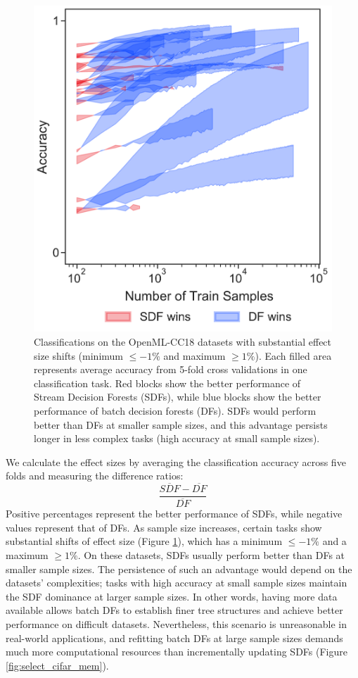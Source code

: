 \begin{figure}[!htb]
\centering
\includegraphics[width=0.4\columnwidth]{cc18_fill}
  \caption{Classifications on the OpenML-CC18 datasets with substantial effect size shifts (minimum $\leq -1\%$ and maximum $\geq 1\%$). Each filled area represents average accuracy from 5-fold cross validations in one classification task. Red blocks show the better performance of Stream Decision Forests (SDFs), while blue blocks show the better performance of batch decision forests (DFs). SDFs would perform better than DFs at smaller sample sizes, and this advantage persists longer in less complex tasks (high accuracy at small sample sizes).
  }
\label{fig:cc18_fill}
\end{figure}

We calculate the effect sizes by averaging the classification accuracy across five folds and measuring the difference ratios:
\begin{equation*} \frac{\overline{SDF} - \overline{DF}}{\overline{DF}} \tag{2} \end{equation*}
Positive percentages represent the better performance of SDFs, while negative values represent that of DFs. 
As sample size increases, certain tasks show substantial shifts of effect size (Figure \ref{fig:cc18_fill}), which has a minimum $\leq -1\%$ and a maximum $\geq 1\%$. 
On these datasets, SDFs usually perform better than DFs at smaller sample sizes. The persistence of such an advantage would depend on the datasets' complexities; tasks with high accuracy at small sample sizes maintain the SDF dominance at larger sample sizes. In other words, having more data available allows batch DFs to establish finer tree structures and achieve better performance on difficult datasets. 
Nevertheless, this scenario is unreasonable in real-world applications, and refitting batch DFs at large sample sizes demands much more computational resources than incrementally updating SDFs (Figure \ref{fig:select_cifar_mem}).

